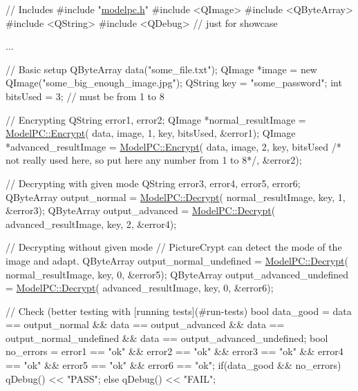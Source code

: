 \begin{DoxyCode}
\textcolor{comment}{// Includes}
\textcolor{preprocessor}{#include "\hyperlink{modelpc_8h}{modelpc.h}"}
\textcolor{preprocessor}{#include <QImage>}
\textcolor{preprocessor}{#include <QByteArray>}
\textcolor{preprocessor}{#include <QString>}
\textcolor{preprocessor}{#include <QDebug>} \textcolor{comment}{// just for showcase}

...

\textcolor{comment}{// Basic setup}
QByteArray data(\textcolor{stringliteral}{"some\_file.txt"});
QImage *image = \textcolor{keyword}{new} QImage(\textcolor{stringliteral}{"some\_big\_enough\_image.jpg"});
QString key = \textcolor{stringliteral}{"some\_password"};
\textcolor{keywordtype}{int} bitsUsed = 3; \textcolor{comment}{// must be from 1 to 8}

\textcolor{comment}{// Encrypting}
QString error1, error2;
QImage *normal\_resultImage = \hyperlink{class_model_p_c_a271cf9285e32df58ffbfc918e6482bbd}{ModelPC::Encrypt}(
        data,
        image,
        1,
        key,
        bitsUsed,
        &error1);
QImage *advanced\_resultImage = \hyperlink{class_model_p_c_a271cf9285e32df58ffbfc918e6482bbd}{ModelPC::Encrypt}(
        data,
        image,
        2, key,
        bitsUsed \textcolor{comment}{/* not really used here, so put here any number from 1 to 8*/},
        &error2);

\textcolor{comment}{// Decrypting with given mode}
QString error3, error4, error5, error6;
QByteArray output\_normal = \hyperlink{class_model_p_c_a902abaea4f07995b48c0f2fea6eceb7c}{ModelPC::Decrypt}(
        normal\_resultImage,
        key,
        1,
        &error3);
QByteArray output\_advanced = \hyperlink{class_model_p_c_a902abaea4f07995b48c0f2fea6eceb7c}{ModelPC::Decrypt}(
        advanced\_resultImage,
        key,
        2,
        &error4);

\textcolor{comment}{// Decrypting without given mode}
\textcolor{comment}{// PictureCrypt can detect the mode of the image and adapt.}
QByteArray output\_normal\_undefined = \hyperlink{class_model_p_c_a902abaea4f07995b48c0f2fea6eceb7c}{ModelPC::Decrypt}(
        normal\_resultImage,
        key,
        0,
        &error5);
QByteArray output\_advanced\_undefined = \hyperlink{class_model_p_c_a902abaea4f07995b48c0f2fea6eceb7c}{ModelPC::Decrypt}(
        advanced\_resultImage,
        key,
        0,
        &error6);

\textcolor{comment}{// Check (better testing with [running tests](#run-tests)}
\textcolor{keywordtype}{bool} data\_good =
        data == output\_normal &&
        data == output\_advanced &&
        data == output\_normal\_undefined &&
        data == output\_advanced\_undefined;
\textcolor{keywordtype}{bool} no\_errors =
        error1 == \textcolor{stringliteral}{"ok"} &&
        error2 == \textcolor{stringliteral}{"ok"} &&
        error3 == \textcolor{stringliteral}{"ok"} &&
        error4 == \textcolor{stringliteral}{"ok"} &&
        error5 == \textcolor{stringliteral}{"ok"} &&
        error6 == \textcolor{stringliteral}{"ok"};
\textcolor{keywordflow}{if}(data\_good && no\_errors)
    qDebug() << \textcolor{stringliteral}{"PASS"};
\textcolor{keywordflow}{else}
    qDebug() << \textcolor{stringliteral}{"FAIL"};
\end{DoxyCode}
